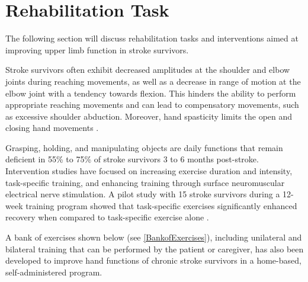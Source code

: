 \section{Rehabilitation Task}

The following section will discuss rehabilitation tasks and interventions aimed at improving upper limb function in stroke survivors.

Stroke survivors often exhibit decreased amplitudes at the shoulder and elbow joints during reaching movements, as well as a decrease in range of motion at the elbow joint with a tendency towards flexion. This hinders the ability to perform appropriate reaching movements and can lead to compensatory movements, such as excessive shoulder abduction. Moreover, hand spasticity limits the open and closing hand movements \cite{Kantak2017}.

Grasping, holding, and manipulating objects are daily functions that remain deficient in 55\% to 75\% of stroke survivors 3 to 6 months post-stroke. Intervention studies have focused on increasing exercise duration and intensity, task-specific training, and enhancing training through surface neuromuscular electrical nerve stimulation. A pilot study with 15 stroke survivors during a 12-week training program showed that task-specific exercises significantly enhanced recovery when compared to task-specific exercise alone \cite{Alon2007}.

A bank of exercises shown below (see \ref{BankofExercises}), including unilateral and bilateral training that can be performed by the patient or caregiver, has also been developed to improve hand functions of chronic stroke survivors in a home-based, self-administered program. 

